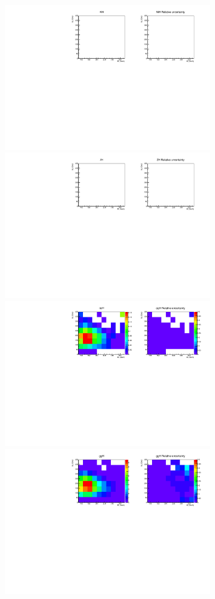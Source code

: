 % 
% 
\begin{figure}[htp]
\centering
\includegraphics[width=0.8\textwidth]{figures/2dtemplate_WH_mH400_0j.pdf}
\includegraphics[width=0.8\textwidth]{figures/2dtemplate_ZH_mH400_0j.pdf}
\includegraphics[width=0.8\textwidth]{figures/2dtemplate_qqH_mH400_0j.pdf}
\includegraphics[width=0.8\textwidth]{figures/2dtemplate_ggH_mH400_0j.pdf}

\end{figure}
